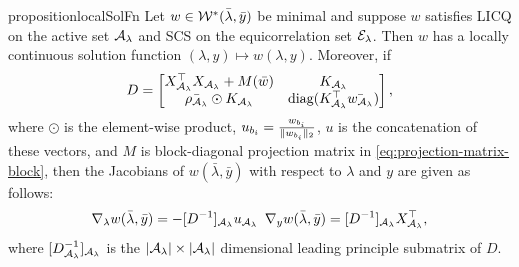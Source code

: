 \begin{restatable}{proposition}{localSolFn}\label{prop:local-sol-fn}
    Let \( w \in \mathcal{W}^*(\bar \lambda, \bar y) \) be minimal and suppose
    \( w \) satisfies LICQ on the active set \( {\mathcal{A}_{\lambda}} \)
    and SCS on the equicorrelation set \( {\mathcal{E}_{\lambda}} \).
    Then \( w \) has a locally continuous solution function
    \( (\lambda, y) \mapsto w(\lambda, y) \).
    Moreover, if
    \[
        D =
        \begin{bmatrix}
            X_{\mathcal{A}_{\lambda}}^\top X_{\mathcal{A}_{\lambda}} + M(\bar w) & K_{\mathcal{A}_{\lambda}}                            \\
            \bar {\rho_{{\mathcal{A}_{\lambda}}}} \odot K_{\mathcal{A}_{\lambda}}       & \text{diag}(K_{\mathcal{A}_{\lambda}}^\top \bar {w_{\mathcal{A}_{\lambda}}})
        \end{bmatrix},
    \]
    where \( \odot \) is the element-wise product,
    \( u_{b_i} = \frac{w_{b_i}}{\|w_{b_i}\|_2} \),
    \( u \) is the concatenation of these vectors,
    and \( M \) is block-diagonal projection matrix in \cref{eq:projection-matrix-block},
    then the Jacobians of \( w(\bar \lambda, \bar y) \)
    with respect to \( \lambda \)
    and \( y \) are given as follows:
    \[
        \nabla_\lambda w(\bar \lambda, \bar y)
        = - [D^{-1}]_{\mathcal{A}_{\lambda}} u_{\mathcal{A}_{\lambda}}
        \hspace{0.5em}
        \nabla_y w(\bar \lambda, \bar y)
        = [D^{-1}]_{\mathcal{A}_{\lambda}} X_{\mathcal{A}_{\lambda}}^\top,
    \]
    where \( [D_{\mathcal{A}_{\lambda}}^{-1}]_{\mathcal{A}_{\lambda}} \) is the \( |{\mathcal{A}_{\lambda}}| \times |{\mathcal{A}_{\lambda}}| \)
    dimensional leading principle submatrix of \( D \).
\end{restatable}
